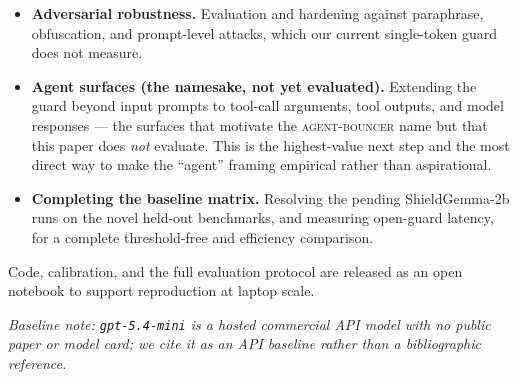 \documentclass[sigconf,nonacm]{acmart}
\begin{document}
\begin{itemize}
  \item \textbf{Adversarial robustness.} Evaluation and hardening against paraphrase, obfuscation, and prompt-level attacks, which our current single-token guard does not measure.
  \item \textbf{Agent surfaces (the namesake, not yet evaluated).} Extending the guard beyond input prompts to tool-call arguments, tool outputs, and model responses --- the surfaces that motivate the \textsc{agent-bouncer} name but that this paper does \emph{not} evaluate. This is the highest-value next step and the most direct way to make the ``agent'' framing empirical rather than aspirational.
  \item \textbf{Completing the baseline matrix.} Resolving the pending ShieldGemma-2b runs on the novel held-out benchmarks, and measuring open-guard latency, for a complete threshold-free and efficiency comparison.
\end{itemize}

Code, calibration, and the full evaluation protocol are released as an open notebook to support reproduction at laptop scale.

\emph{Baseline note: \texttt{gpt-5.4-mini} is a hosted commercial API model with no public paper or model card; we cite it as an API baseline rather than a bibliographic reference.}



\end{document}
